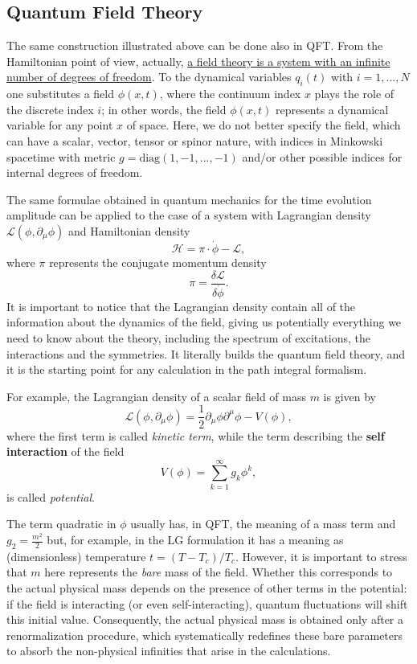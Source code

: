\subsection{Quantum Field Theory}

The same construction illustrated above can be done also in QFT.
From the Hamiltonian point of view, actually, \uline{a field theory is a system with an infinite number of degrees of freedom}.
To the dynamical variables \(q_{i}(t)\) with \(i=1,...,N\) one substitutes a field \(\phi(x,t)\), where the continuum index \(x\) plays the role of the discrete index \(i\); in other words, the field \(\phi(x,t)\) represents a dynamical variable for any point \(x\) of space.
Here, we do not better specify the field, which can have a scalar, vector, tensor or spinor nature, with indices in Minkowski spacetime with metric \(g=\text{diag}(1,-1,...,-1)\) and/or other possible indices for internal degrees of freedom.

The same formulae obtained in quantum mechanics for the time evolution amplitude can be applied to the case of a system with Lagrangian density \(\mathcal{L}(\phi,\partial_{\mu}\phi)\) and Hamiltonian density
\[
    \mathcal{H}=\pi\cdot\dot{\phi}-\mathcal{L},
\]
where \(\pi\) represents the conjugate momentum density
\[
    \pi=\frac{\delta\mathcal{L}}{\delta\dot{\phi}}.
\]
It is important to notice that the Lagrangian density contain all of the information about the dynamics of the field, giving us potentially everything we need to know about the theory, including the spectrum of excitations, the interactions and the symmetries. It literally builds the quantum field theory, and it is the starting point for any calculation in the path integral formalism.

For example, the Lagrangian density of a scalar field of mass \(m\) is given by
\[
    \mathcal{L}(\phi,\partial_{\mu}\phi)=\frac{1}{2}\partial_{\mu}\phi\partial^{\mu}\phi-V(\phi),
\]
where the first term is called \textit{kinetic term}, while the term describing the \textbf{self interaction} of the field
\[
    V(\phi)=\sum_{k=1}^{\infty}g_{k}\phi^{k},
\]
is called \textit{potential}.

The term quadratic in \(\phi\) usually has, in QFT, the meaning of a mass term and \(g_{2}=\tfrac{m^2}{2}\) but, for example, in the LG formulation it has a meaning as (dimensionless) temperature \(t=(T-T_{c})/T_{c}.\)
However, it is important to stress that \(m\) here represents the \textit{bare} mass of the field. Whether this corresponds to the actual physical mass depends on the presence of other terms in the potential: if the field is interacting (or even self-interacting), quantum fluctuations will shift this initial value. Consequently, the actual physical mass is obtained only after a renormalization procedure, which systematically redefines these bare parameters to absorb the non-physical infinities that arise in the calculations.

